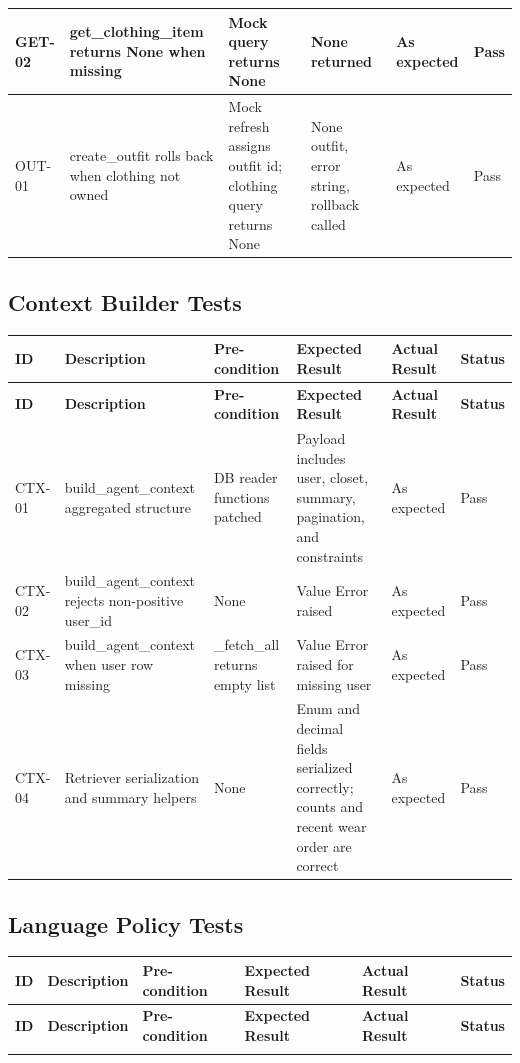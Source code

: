 \begin{appendices}
{\begin{longtable}{|p{1.2cm}|p{3.0cm}|p{2.8cm}|p{3.2cm}|p{2.2cm}|p{1.1cm}|}
GET-02 &
get\_clothing\_item returns None when missing &
Mock query returns None &
None returned &
As expected &
Pass \\
\hline

OUT-01 &
create\_outfit rolls back when clothing not owned &
Mock refresh assigns outfit id; clothing query returns None &
None outfit, error string, rollback called &
As expected &
Pass \\
\hline

\end{longtable}

\subsection*{Context Builder Tests}
\begin{longtable}{|p{1.2cm}|p{3.0cm}|p{2.8cm}|p{3.2cm}|p{2.2cm}|p{1.1cm}|}
\hline
\textbf{ID} & \textbf{Description} & \textbf{Pre-condition} & \textbf{Expected Result} & \textbf{Actual Result} & \textbf{Status} \\
\hline
\endfirsthead
\hline
\textbf{ID} & \textbf{Description} & \textbf{Pre-condition} & \textbf{Expected Result} & \textbf{Actual Result} & \textbf{Status} \\
\hline
\endhead
\hline
\endfoot

CTX-01 &
build\_agent\_context aggregated structure &
DB reader functions patched &
Payload includes user, closet, summary, pagination, and constraints &
As expected &
Pass \\
\hline

CTX-02 &
build\_agent\_context rejects non-positive user\_id &
None &
Value Error raised &
As expected &
Pass \\
\hline

CTX-03 &
build\_agent\_context when user row missing &
\_fetch\_all returns empty list &
Value Error raised for missing user &
As expected &
Pass \\
\hline

CTX-04 &
Retriever serialization and summary helpers &
None &
Enum and decimal fields serialized correctly; counts and recent wear order are correct &
As expected &
Pass \\
\hline

\end{longtable}

\subsection*{Language Policy Tests}
\begin{longtable}{|p{1.2cm}|p{3.0cm}|p{2.8cm}|p{3.2cm}|p{2.2cm}|p{1.1cm}|}
\hline
\textbf{ID} & \textbf{Description} & \textbf{Pre-condition} & \textbf{Expected Result} & \textbf{Actual Result} & \textbf{Status} \\
\hline
\endfirsthead
\hline
\textbf{ID} & \textbf{Description} & \textbf{Pre-condition} & \textbf{Expected Result} & \textbf{Actual Result} & \textbf{Status} \\
\hline
\endhead
\hline
\endfoot


\end{longtable}}
\end{appendices}
